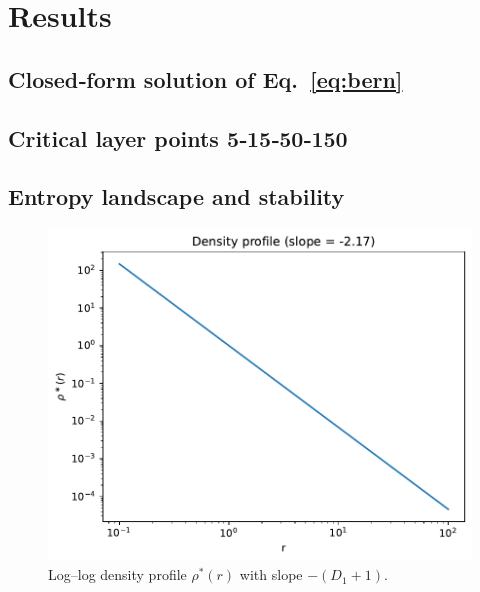 \section{Results}\label{sec:results}

\subsection{Closed‑form solution of Eq.~\ref{eq:bern}}

\subsection{Critical layer points 5‑15‑50‑150}

\subsection{Entropy landscape and stability}

\begin{figure}[ht]
  \centering
  \includegraphics[width=0.7\linewidth]{figs/Fig1_density.pdf}
  \caption{Log–log density profile $\rho^\ast(r)$ with slope $-(D_1+1)$.}
  \label{fig:density}
\end{figure}